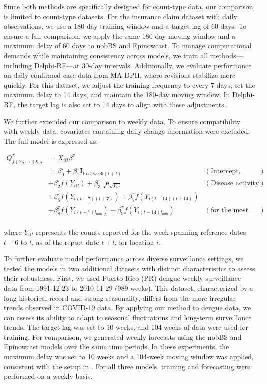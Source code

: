 Since both methods are specifically designed for count-type data, our comparison is limited to count-type datasets. For the insurance claim dataset with daily observations, we use a 180-day training window and a target lag of 60 days. To ensure a fair comparison, we apply the same 180-day moving window and a maximum delay of 60 days to nobBS and Epinowcast. To manage computational demands while maintaining consistency across models, we train all methods—including Delphi-RF—at 30-day intervals. Additionally, we evaluate performance on daily confirmed case data from MA-DPH, where revisions stabilize more quickly. For this dataset, we adjust the training frequency to every 7 days, set the maximum delay to 14 days, and maintain the 180-day moving window. In Delphi-RF, the target lag is also set to 14 days to align with these adjustments.

We further extended our comparison to weekly data. To ensure compatibility with weekly data, covariates containing daily change information were excluded. The full model is expressed as:

\begin{align*} 
Q_{f(Y_{itL}))|X_{itl}}^{\tau} &=  X_{itl}\beta^{\tau}\\
& = \beta_0^{\tau}  + \beta_{1}^{\tau}\mathbf{I}_{\text{first-week}(t+l)} &(\text{Intercept, week-of-month effects})\\ 
& + \beta_{2}^{\tau}f(Y_{itl}) + \beta_{3:5}^{\tau}\mathbf{e}_{\sqrt{Y_{itl}}} &(\text{Disease activity level}) \\ 
& + \beta_{6}^{\tau}f(Y_{i(t-7)(l+7)})+ \beta_{7}^{\tau}f(Y_{i(t-14)(l+14)}) \\
& + \beta_{8}^{\tau}f(Y_{i(t-7)l_{\text{min}}})+ \beta_{9}^{\tau}f(Y_{i(t-14)l_{\text{min}}})  &(\text{for the most recent changes}) \\ 
\end{align*}

where \(Y_{itl}\) represents the counts reported for the week spanning reference dates \(t-6\) to \(t\), as of the report date \(t+l\), for location \(i\). 

To further evaluate model performance across diverse surveillance settings, we tested the models in two additional datasets with distinct characteristics to assess their robustness. First, we used Puerto Rico (PR) dengue weekly surveillance data from 1991-12-23 to 2010-11-29 (989 weeks). This dataset, characterized by a long historical record and strong seasonality, differs from the more irregular trends observed in COVID-19 data. By applying our method to dengue data, we can assess its ability to adapt to seasonal fluctuations and long-term surveillance trends. The target lag was set to 10 weeks, and 104 weeks of data were used for training. For comparison, we generated weekly forecasts using the nobBS and Epinowcast models over the same time periods. In these experiments, the maximum delay was set to 10 weeks and a 104-week moving window was applied, consistent with the setup in \cite{McGough2020}. For all three models, training and forecasting were performed on a weekly basis. 

